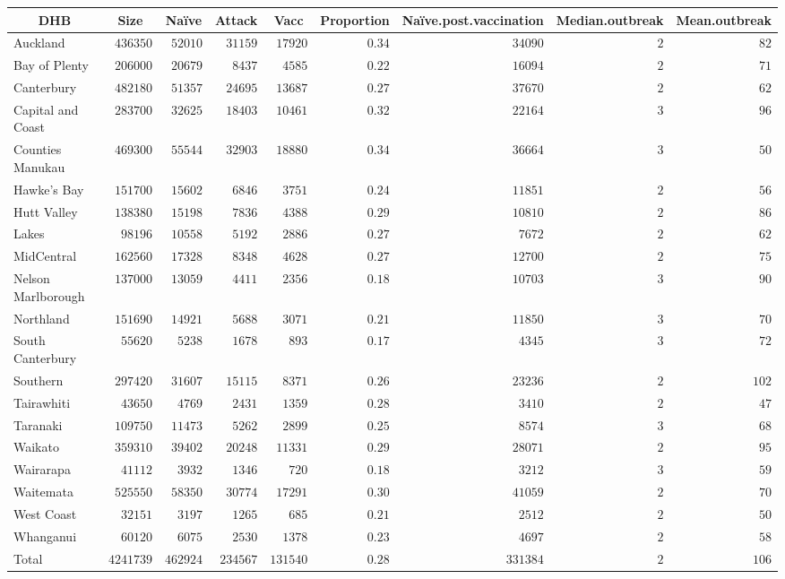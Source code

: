 \documentclass{article}
\begin{document}
\begin{itemize}
\begin{table}
\begin{center}
\begin{tabular}{lrrrrrrrr}
\hline\hline
\multicolumn{1}{c}{DHB}&\multicolumn{1}{c}{Size}&\multicolumn{1}{c}{Naïve}&\multicolumn{1}{c}{Attack}&\multicolumn{1}{c}{Vacc}&\multicolumn{1}{c}{Proportion}&\multicolumn{1}{c}{Naïve.post.vaccination}&\multicolumn{1}{c}{Median.outbreak}&\multicolumn{1}{c}{Mean.outbreak}\tabularnewline
\hline
Auckland&$ 436350$&$ 52010$&$ 31159$&$ 17920$&$0.34$&$ 34090$&$2$&$ 82$\tabularnewline
Bay of Plenty&$ 206000$&$ 20679$&$  8437$&$  4585$&$0.22$&$ 16094$&$2$&$ 71$\tabularnewline
Canterbury&$ 482180$&$ 51357$&$ 24695$&$ 13687$&$0.27$&$ 37670$&$2$&$ 62$\tabularnewline
Capital and Coast&$ 283700$&$ 32625$&$ 18403$&$ 10461$&$0.32$&$ 22164$&$3$&$ 96$\tabularnewline
Counties Manukau&$ 469300$&$ 55544$&$ 32903$&$ 18880$&$0.34$&$ 36664$&$3$&$ 50$\tabularnewline
Hawke's Bay&$ 151700$&$ 15602$&$  6846$&$  3751$&$0.24$&$ 11851$&$2$&$ 56$\tabularnewline
Hutt Valley&$ 138380$&$ 15198$&$  7836$&$  4388$&$0.29$&$ 10810$&$2$&$ 86$\tabularnewline
Lakes&$  98196$&$ 10558$&$  5192$&$  2886$&$0.27$&$  7672$&$2$&$ 62$\tabularnewline
MidCentral&$ 162560$&$ 17328$&$  8348$&$  4628$&$0.27$&$ 12700$&$2$&$ 75$\tabularnewline
Nelson Marlborough&$ 137000$&$ 13059$&$  4411$&$  2356$&$0.18$&$ 10703$&$3$&$ 90$\tabularnewline
Northland&$ 151690$&$ 14921$&$  5688$&$  3071$&$0.21$&$ 11850$&$3$&$ 70$\tabularnewline
South Canterbury&$  55620$&$  5238$&$  1678$&$   893$&$0.17$&$  4345$&$3$&$ 72$\tabularnewline
Southern&$ 297420$&$ 31607$&$ 15115$&$  8371$&$0.26$&$ 23236$&$2$&$102$\tabularnewline
Tairawhiti&$  43650$&$  4769$&$  2431$&$  1359$&$0.28$&$  3410$&$2$&$ 47$\tabularnewline
Taranaki&$ 109750$&$ 11473$&$  5262$&$  2899$&$0.25$&$  8574$&$3$&$ 68$\tabularnewline
Waikato&$ 359310$&$ 39402$&$ 20248$&$ 11331$&$0.29$&$ 28071$&$2$&$ 95$\tabularnewline
Wairarapa&$  41112$&$  3932$&$  1346$&$   720$&$0.18$&$  3212$&$3$&$ 59$\tabularnewline
Waitemata&$ 525550$&$ 58350$&$ 30774$&$ 17291$&$0.30$&$ 41059$&$2$&$ 70$\tabularnewline
West Coast&$  32151$&$  3197$&$  1265$&$   685$&$0.21$&$  2512$&$2$&$ 50$\tabularnewline
Whanganui&$  60120$&$  6075$&$  2530$&$  1378$&$0.23$&$  4697$&$2$&$ 58$\tabularnewline
Total&$4241739$&$462924$&$234567$&$131540$&$0.28$&$331384$&$2$&$106$\tabularnewline
\hline
\end{tabular}\end{center}\label{table:vacp}
\end{table}


\end{itemize}
\end{document}
